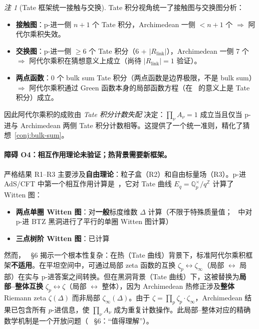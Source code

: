 \documentclass[11pt,a4paper]{ctexart}
\theoremstyle{remark}
\newtheorem{remark}[theorem]{注}
\newcommand{\Qp}{\mathbb{Q}_p}
\begin{document}
\begin{remark}[Tate 框架统一接触与交换]
\label{rem:tate-unify}
Tate 积分视角统一了接触图与交换图分析：
\begin{itemize}[leftmargin=2em]
    \item \textbf{接触图}：p-进一侧 $n{+}1$ 个 Tate 积分，Archimedean 一侧 $< n{+}1$ 个 $\Rightarrow$ 阿代尔乘积失效。
    \item \textbf{交换图}：p-进一侧 $\geq 6$ 个 Tate 积分（6 + $|R_{\mathrm{link}}|$），Archimedean 一侧 7 个 $\Rightarrow$ 阿代尔乘积在猜想意义上成立（尚待 $|R_{\mathrm{link}}| = 1$ 验证）。
    \item \textbf{两点函数}：0 个 bulk sum Tate 积分（两点函数是边界极限，不是 bulk sum）$\Rightarrow$ 阿代尔乘积通过 Green 函数本身的局部函数方程（在~\cite{HSYZ20} 的意义上是 Tate 积分）成立。
\end{itemize}
因此阿代尔乘积的成败由 \emph{Tate 积分计数失配} 决定：$\prod_\nu A_\nu = 1$ 成立当且仅当 p-进与 Archimedean 两侧 Tate 积分计数相等。这提供了一个统一准则，精化了猜想~\ref{conj:bulk-sum}。
\end{remark}

\paragraph{障碍 O4：相互作用理论未验证；热背景需要新框架。}
严格结果 R1--R3 主要涉及\textbf{自由理论}：粒子盒（R2）和自由标量场（R3）。p-进 AdS/CFT 中第一个相互作用计算是~\cite{HJ24}，它对 Tate 曲线 $E_q = \Qp^\times / q^{\mathbb{Z}}$ 计算了 Witten 图：
\begin{itemize}[leftmargin=2em]
    \item \textbf{两点单圈 Witten 图}：对\textbf{一般}标度维数 $\Delta$ 计算（不限于特殊质量值；~\cite{ESZ19} 中对 p-进 BTZ 黑洞进行了平行的单圈 Witten 图计算）
    \item \textbf{三点树阶 Witten 图}：已计算
\end{itemize}
然而，~\cite{HJ24} \S6 揭示一个根本性复杂：在热（Tate 曲线）背景下，标准阿代尔乘积框架\textbf{不适用}。在平坦空间中，可通过局部 zeta 函数的互换 $\zeta_p \leftrightarrow \zeta_\infty$（局部 $\leftrightarrow$ 局部）在实与 p-进答案之间转换。但在黑洞背景（Tate 曲线）下，这被替换为\textbf{局部--整体互换} $\zeta_p \leftrightarrow \zeta$（局部 $\leftrightarrow$ 整体），因为 Archimedean 热修正涉及\textbf{整体} Riemann zeta $\zeta(\Delta)$ 而非局部 $\zeta_\infty(\Delta)$。由于 $\zeta = \prod_p \zeta_p \cdot \zeta_\infty$，Archimedean 结果已包含所有 $p$-进信息，使 $\prod_\nu A_\nu$ 成为重复计数操作。此局部--整体对应的精确数学机制是一个开放问题（~\cite{HJ24} \S6：``值得理解''）。
\end{document}

